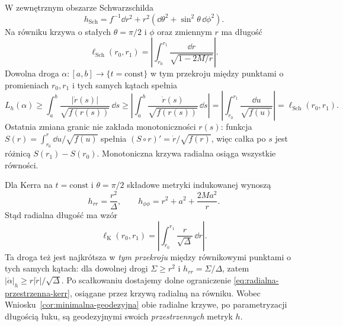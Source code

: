W zewnętrznym obszarze Schwarzschilda
\[
 h_{\mathrm{Sch}}=f^{-1}\dd r^2
    +r^2(\dd\theta^2+\sin^2\theta\,\dd\phi^2).
\]
Na równiku krzywa o stałych $\theta=\pi/2$
i $\phi$ oraz zmiennym $r$ ma długość
\begin{equation}\label{eq:radialna-przestrzenna-schwarz}
 \ell_{\mathrm{Sch}}(r_0,r_1)
  =\left|\int_{r_0}^{r_1}
               \frac{\dd r}{\sqrt{1-2M/r}}\right|.
\end{equation}
Dowolna droga $\alpha:[a,b]\to\{t=\mathrm{const}\}$
w tym przekroju między punktami o promieniach $r_0,r_1$
i tych samych kątach spełnia
\[
 L_h(\alpha)\geq\int_a^b\frac{|\dot r(s)|}{\sqrt{f(r(s))}}\,\dd s
 \geq\left|\int_a^b\frac{\dot r(s)}{\sqrt{f(r(s))}}\,\dd s\right|
 =\left|\int_{r_0}^{r_1}\frac{\dd u}{\sqrt{f(u)}}\right|
 =\ell_{\mathrm{Sch}}(r_0,r_1).
\]
Ostatnia zmiana granic nie zakłada monotoniczności $r(s)$:
funkcja $S(r)=\int_{r_0}^r\dd u/\sqrt{f(u)}$ spełnia
$(S\circ r)'=\dot r/\sqrt{f(r)}$, więc całka po $s$
jest różnicą $S(r_1)-S(r_0)$.
Monotoniczna krzywa radialna osiąga wszystkie równości.

Dla Kerra na $t=\mathrm{const}$ i $\theta=\pi/2$
składowe metryki indukowanej wynoszą
\[
 h_{rr}=\frac{r^2}{\Delta},\qquad
 h_{\phi\phi}=r^2+a^2+\frac{2Ma^2}{r}.
\]
Stąd radialna długość ma wzór
\begin{equation}\label{eq:radialna-przestrzenna-kerr}
 \ell_{\mathrm K}(r_0,r_1)
   =\left|\int_{r_0}^{r_1}
                   \frac r{\sqrt\Delta}\,\dd r\right|.
\end{equation}
Ta droga też jest najkrótsza w \emph{tym przekroju}
między równikowymi punktami o tych samych
kątach: dla dowolnej drogi $\Sigma\geq r^2$
i $h_{rr}=\Sigma/\Delta$, zatem
$|\dot\alpha|_h\geq r|\dot r|/\sqrt\Delta$.
Po scałkowaniu dostajemy dolne ograniczenie
\eqref{eq:radialna-przestrzenna-kerr}, osiągane
przez krzywą radialną na równiku. Wobec
Wniosku~\ref{cor:minimalna-geodezyjna}
obie radialne krzywe, po parametryzacji
długością łuku, są geodezyjnymi swoich
\emph{przestrzennych} metryk $h$.

